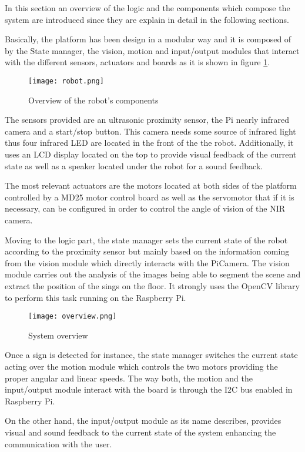 In this section an overview of the logic and the components which compose the system are introduced since they are explain in detail in the following sections. 

Basically, the platform has been design in a modular way and it is composed of by the State manager, the vision, motion and input/output modules that interact with the different sensors, actuators and boards as it is shown in figure \ref{fig:components}.

\begin{figure}[h!]
\centering
	\texttt{[image: robot.png]}
	\caption{Overview of the robot's components}
	\label{fig:components}
\end{figure}

The sensors provided are an ultrasonic proximity sensor, the Pi nearly infrared camera and a start/stop button. This camera needs some source of infrared light thus four infrared LED are located in the front of the the robot. Additionally, it uses an LCD display located on the top to provide visual feedback of the current state as well as a speaker located under the robot for a sound feedback.

The most relevant actuators are the motors located at both sides of the platform controlled by a MD25 motor control board as well as the servomotor that if it is necessary, can be configured in order to control the angle of vision of the NIR camera.

Moving to the logic part, the state manager sets the current state of the robot according to the proximity sensor but mainly based on the information coming from the vision module which directly interacts with the PiCamera. The vision module carries out the analysis of the images being able to segment the scene and extract the position of the sings on the floor. It strongly uses the OpenCV library to perform this task running on the Raspberry Pi. 

\begin{figure}[h!]
     \centering
     \texttt{[image: overview.png]}
     \caption{System overview}
     \label{fig:overview}
\end{figure}

Once a sign is detected for instance, the state manager switches the current state acting over the motion module which controls the two motors providing the proper angular and linear speeds. The way both, the motion and the input/output module interact with the board is through the I2C bus enabled in Raspberry Pi.

On the other hand, the input/output module as its name describes, provides visual and sound feedback to the current state of the system enhancing the communication with the user.
